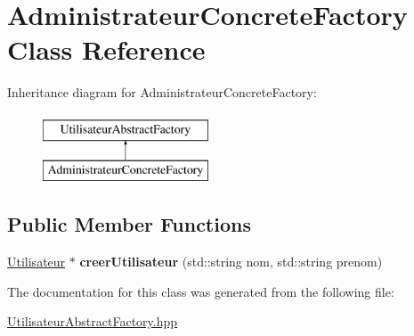 \hypertarget{classAdministrateurConcreteFactory}{\section{Administrateur\-Concrete\-Factory Class Reference}
\label{classAdministrateurConcreteFactory}
}
Inheritance diagram for Administrateur\-Concrete\-Factory\-:\begin{figure}[H]
\begin{center}
\leavevmode
\includegraphics[height=2.000000cm]{classAdministrateurConcreteFactory}
\end{center}
\end{figure}
\subsection*{Public Member Functions}
\begin{DoxyCompactItemize}
\item 
\hypertarget{classAdministrateurConcreteFactory_a17bfd0bf30fbb82ee3053e027a6ca4a8}{\hyperlink{classUtilisateur}{Utilisateur} $\ast$ {\bfseries creer\-Utilisateur} (std\-::string nom, std\-::string prenom)}\label{classAdministrateurConcreteFactory_a17bfd0bf30fbb82ee3053e027a6ca4a8}

\end{DoxyCompactItemize}


The documentation for this class was generated from the following file\-:\begin{DoxyCompactItemize}
\item 
\hyperlink{UtilisateurAbstractFactory_8hpp}{Utilisateur\-Abstract\-Factory.\-hpp}\end{DoxyCompactItemize}
